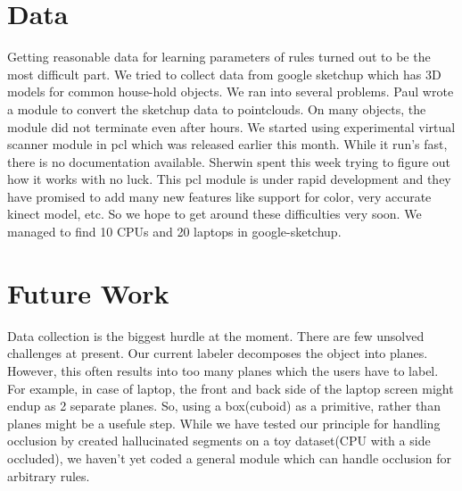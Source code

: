 \documentclass[11pt]{article} %
\begin{document}
\section{Data}
Getting reasonable data for learning parameters of rules turned out to be the most difficult part. We tried to collect data from google sketchup which has 3D models for common house-hold objects. We ran into several problems. Paul wrote a module to convert the sketchup data to pointclouds. On many objects, the module did not terminate even after hours. We started using experimental virtual scanner module in pcl which was released earlier this month. While it run's fast, there is no documentation available. Sherwin spent this week trying to figure out how it works with no luck. This pcl module is under rapid development and they have promised to add many new features like support for color, very accurate kinect model, etc. So we hope to get around these difficulties very soon. We managed to find 10 CPUs and 20 laptops in google-sketchup. \\

\section{Future Work}
Data collection is the biggest hurdle at the moment. There are few unsolved challenges at present.  Our current labeler decomposes the object into planes. However, this often results into too many planes which the users have to label. For example, in case of laptop, the front and back side of the laptop screen might endup as 2 separate planes. So, using a box(cuboid) as a primitive, rather than planes might be a usefule step. While we have tested our principle for handling occlusion by created hallucinated segments on a toy dataset(CPU with a side occluded), we haven't yet coded a general module which can handle occlusion for arbitrary rules.


{  


}
\end{document}
